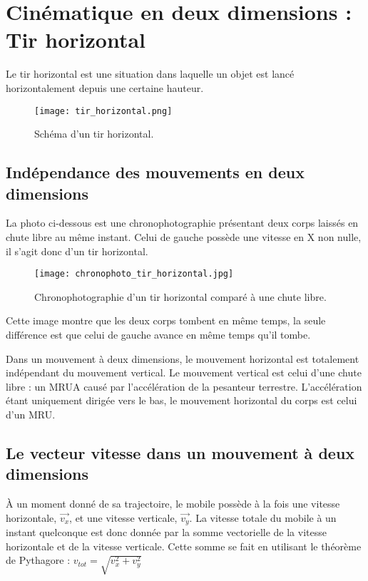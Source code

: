 \chapter{Cinématique en deux dimensions : Tir horizontal}
Le tir horizontal est une situation dans laquelle un objet est lancé horizontalement depuis une certaine hauteur.

\begin{figure}[h!]
    \centering
    \texttt{[image: tir\_horizontal.png]}
    \caption{Schéma d'un tir horizontal.}
    \label{Schéma d'un tir horizontal}
\end{figure}

\section{Indépendance des mouvements en deux dimensions}
La photo ci-dessous est une chronophotographie présentant deux corps laissés en chute libre au même instant. Celui de gauche possède une vitesse en X non nulle, il s'agit donc d'un tir horizontal.
\begin{figure}[h!]
    \centering
    \texttt{[image: chronophoto\_tir\_horizontal.jpg]}
    \caption{Chronophotographie d'un tir horizontal comparé à une chute libre.}
    \label{chronophoto_tir_horizontal}
\end{figure}
Cette image montre que les deux corps tombent en même temps, la seule différence est que celui de gauche avance en même temps qu'il tombe.


\begin{encadre}
    Dans un mouvement à deux dimensions, le mouvement horizontal est totalement indépendant du mouvement vertical. Le mouvement vertical est celui d'une chute libre : un MRUA causé par l'accélération de la pesanteur terrestre.
    L'accélération étant uniquement dirigée vers le bas, le mouvement horizontal du corps est celui d'un MRU.
\end{encadre}

\newpage

\section{Le vecteur vitesse dans un mouvement à deux dimensions}
À un moment donné de sa trajectoire, le mobile possède à la fois une vitesse horizontale, \(\vec{v_x}\), et une vitesse verticale, \(\vec{v_y}\). La vitesse totale du mobile à un instant quelconque est donc donnée par la somme vectorielle de la vitesse horizontale et de la vitesse verticale. Cette somme se fait en utilisant le théorème de Pythagore : \(v_{tot}=\sqrt{v_x ^2 + v_y ^2}\)

